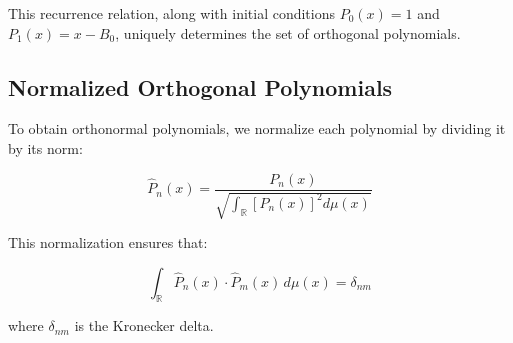 \documentclass{article}
\begin{document}
This recurrence relation, along with initial conditions $P_0(x) = 1$ and $P_1(x) = x - B_0$, uniquely determines the set of orthogonal polynomials.

\subsection{Normalized Orthogonal Polynomials}

To obtain orthonormal polynomials, we normalize each polynomial by dividing it by its norm:

\[\hat{P}_n(x) = \frac{P_n(x)}{\sqrt{\int_{\mathbb{R}} [P_n(x)]^2 d\mu(x)}}\]

This normalization ensures that:

\[\int_{\mathbb{R}} \hat{P}_n(x) \cdot \hat{P}_m(x) \, d\mu(x) = \delta_{nm}\]

where $\delta_{nm}$ is the Kronecker delta.
\end{document}
